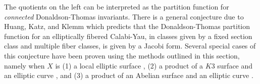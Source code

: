 \documentclass[12pt]{amsart}
\theoremstyle{definition}
\begin{document}
The quotients on the left can be interpreted as the partition function
for \emph{connected} Donaldson-Thomas invariants. There is a general
conjecture due to Huang, Katz, and Klemm \cite{Huang-Katz-Klemm} which
predicts that the Donaldson-Thomas partition function for an
elliptically fibered Calabi-Yau, in classes given by a fixed section
class and multiple fiber classes, is given by a Jacobi form. Several
special cases of this conjecture have been proven using the methods
outlined in this section, namely when $X$ is (1) a local elliptic
surface \cite{Bryan-Kool}, (2) a product of a $K3$ surface and an
elliptic curve \cite{Bryan-K3xE}, and (3) a product of an Abelian
surface and an elliptic curve \cite{BOPY}.


       


\end{document}
